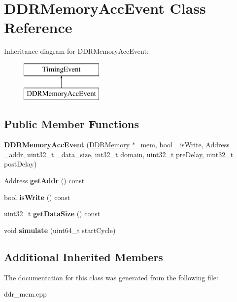 \hypertarget{classDDRMemoryAccEvent}{\section{D\-D\-R\-Memory\-Acc\-Event Class Reference}
\label{classDDRMemoryAccEvent}
}
Inheritance diagram for D\-D\-R\-Memory\-Acc\-Event\-:\begin{figure}[H]
\begin{center}
\leavevmode
\includegraphics[height=2.000000cm]{classDDRMemoryAccEvent}
\end{center}
\end{figure}
\subsection*{Public Member Functions}
\begin{DoxyCompactItemize}
\item 
\hypertarget{classDDRMemoryAccEvent_a48e243a2b1d85590ff162a8bacb7fe06}{{\bfseries D\-D\-R\-Memory\-Acc\-Event} (\hyperlink{classDDRMemory}{D\-D\-R\-Memory} $\ast$\-\_\-mem, bool \-\_\-is\-Write, Address \-\_\-addr, uint32\-\_\-t \-\_\-data\-\_\-size, int32\-\_\-t domain, uint32\-\_\-t pre\-Delay, uint32\-\_\-t post\-Delay)}\label{classDDRMemoryAccEvent_a48e243a2b1d85590ff162a8bacb7fe06}

\item 
\hypertarget{classDDRMemoryAccEvent_a9027a4ac2269ed13a4d7413757603608}{Address {\bfseries get\-Addr} () const }\label{classDDRMemoryAccEvent_a9027a4ac2269ed13a4d7413757603608}

\item 
\hypertarget{classDDRMemoryAccEvent_a8599665610dfb9a19724f8286f97e4ca}{bool {\bfseries is\-Write} () const }\label{classDDRMemoryAccEvent_a8599665610dfb9a19724f8286f97e4ca}

\item 
\hypertarget{classDDRMemoryAccEvent_a2ac5b6b762f34a18f7d07463ffd072be}{uint32\-\_\-t {\bfseries get\-Data\-Size} () const }\label{classDDRMemoryAccEvent_a2ac5b6b762f34a18f7d07463ffd072be}

\item 
\hypertarget{classDDRMemoryAccEvent_ae37e788bac980a59b318cdabcf53e817}{void {\bfseries simulate} (uint64\-\_\-t start\-Cycle)}\label{classDDRMemoryAccEvent_ae37e788bac980a59b318cdabcf53e817}

\end{DoxyCompactItemize}
\subsection*{Additional Inherited Members}


The documentation for this class was generated from the following file\-:\begin{DoxyCompactItemize}
\item 
ddr\-\_\-mem.\-cpp\end{DoxyCompactItemize}
